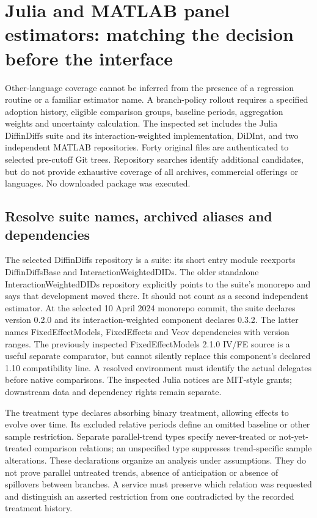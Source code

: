 \section{Julia and MATLAB panel estimators: matching the decision before the interface}
\label{sec:exec25-panels-other}
Other-language coverage cannot be inferred from the presence of a regression
routine or a familiar estimator name. A branch-policy rollout requires a
specified adoption history, eligible comparison groups, baseline periods,
aggregation weights and uncertainty calculation. The inspected set includes
the Julia DiffinDiffs suite and its interaction-weighted implementation,
DiDInt, and two independent MATLAB repositories. Forty original files are
authenticated to selected pre-cutoff Git trees. Repository searches identify
additional candidates, but do not provide exhaustive coverage of all archives,
commercial offerings or languages. No downloaded package was executed.
\citep{exec25_panelother_choice}

\subsection{Resolve suite names, archived aliases and dependencies}
The selected DiffinDiffs repository is a suite: its short entry module
reexports DiffinDiffsBase and InteractionWeightedDIDs. The older standalone
InteractionWeightedDIDs repository explicitly points to the suite's monorepo
and says that development moved there. It should not count as a second
independent estimator. At the selected 10 April 2024 monorepo commit, the
suite declares version 0.2.0 and its interaction-weighted component declares
0.3.2. The latter names FixedEffectModels, FixedEffects and Vcov dependencies
with version ranges. The previously inspected FixedEffectModels 2.1.0 IV/FE
source is a useful separate comparator, but cannot silently replace this
component's declared 1.10 compatibility line. A resolved environment must
identify the actual delegates before native comparisons. The inspected
Julia notices are MIT-style grants; downstream data and dependency rights
remain separate.~\citep{exec25_panelother_julia,exec23_otheriv_source_0}

The treatment type declares absorbing binary treatment, allowing effects to
evolve over time. Its excluded relative periods define an omitted baseline
or other sample restriction. Separate parallel-trend types specify
never-treated or not-yet-treated comparison relations; an unspecified type
suppresses trend-specific sample alterations. These declarations organize
an analysis under assumptions. They do not prove parallel untreated trends,
absence of anticipation or absence of spillovers between branches. A service
must preserve which relation was requested and distinguish an asserted
restriction from one contradicted by the recorded treatment history.
\citep{exec25_panelother_julia,exec25_panelother_choice}

